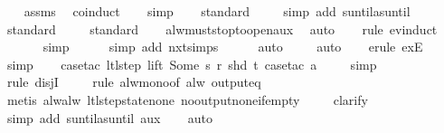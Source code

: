 \begin{isabellebody}
%
\isadelimproof
\ \ %
\endisadelimproof
%
\isatagproof
{}\isamarkupfalse%
\ assms\ \isamarkupfalse%
\ coinduct\isanewline
\ \ \isamarkupfalse%
\ simp\isanewline
\ \ \isamarkupfalse%
\ standard\isanewline
\ \ \ \isamarkupfalse%
\ {\isacharparenleft}simp\ add{\isacharcolon}\ suntil{\isacharunderscore}as{\isacharunderscore}until{\isacharparenright}\isanewline
\ \ \ \isamarkupfalse%
\ standard\isanewline
\ \ \ \isamarkupfalse%
\ standard\isanewline
\ \ \isamarkupfalse%
\ alw{\isacharunderscore}must{\isacharunderscore}stop{\isacharunderscore}to{\isacharunderscore}open{\isacharunderscore}aux\ \isamarkupfalse%
\ auto{\isacharbrackleft}{}{\isacharbrackright}\isanewline
\ \ \isamarkupfalse%
\ {\isacharparenleft}rule\ ev{\isachardot}induct{\isacharparenright}\isanewline
\ \ \ \ \ \isamarkupfalse%
\ simp\isanewline
\ \ \ \ \isamarkupfalse%
\ {\isacharparenleft}simp\ add{\isacharcolon}\ nxt{\isachardot}simps{\isacharparenright}\isanewline
\ \ \ \ \isamarkupfalse%
\ auto{\isacharbrackleft}{}{\isacharbrackright}\isanewline
\ \ \ \isamarkupfalse%
\ auto{\isacharbrackleft}{}{\isacharbrackright}\isanewline
\isanewline
\ \ \isamarkupfalse%
\ {\isacharparenleft}erule\ exE{\isacharparenright}{\isacharplus}\isanewline
\ \ \isamarkupfalse%
\ simp\isanewline
\ \ \isamarkupfalse%
\ {\isacharparenleft}case{\isacharunderscore}tac\ {\isachardoublequoteopen}ltl{\isacharunderscore}step\ lift\ {\isacharparenleft}Some\ s{\isacharparenright}\ r\ {\isacharparenleft}shd\ t{\isacharparenright}{\isachardoublequoteclose}{\isacharcomma}\ case{\isacharunderscore}tac\ a{\isacharparenright}\isanewline
\ \ \ \isamarkupfalse%
\ simp\isanewline
\ \ \ \isamarkupfalse%
\ {\isacharparenleft}rule\ disjI{}{\isacharparenright}\isanewline
\ \ \ \isamarkupfalse%
\ {\isacharparenleft}rule\ alw{\isacharunderscore}mono{\isacharbrackleft}of\ {\isachardoublequoteopen}alw\ {\isacharparenleft}output{\isacharunderscore}eq\ {\isacharbrackleft}{\isacharbrackright}{\isacharparenright}{\isachardoublequoteclose}{\isacharbrackright}{\isacharparenright}\isanewline
\ \ \ \ \isamarkupfalse%
\ {\isacharparenleft}metis\ alw{\isacharunderscore}alw\ ltl{\isacharunderscore}step{\isacharunderscore}state{\isacharunderscore}none\ no{\isacharunderscore}output{\isacharunderscore}none{\isacharunderscore}if{\isacharunderscore}empty{\isacharparenright}\isanewline
\ \ \ \isamarkupfalse%
\ clarify\isanewline
\ \ \ \isamarkupfalse%
\ {\isacharparenleft}simp\ add{\isacharcolon}\ suntil{\isacharunderscore}as{\isacharunderscore}until\ aux{\isacharparenright}\isanewline
\ \ \isamarkupfalse%
\ auto%
\endisatagproof
{\isafoldproof}%
%
\isadelimproof
\isanewline
%
\endisadelimproof
%
\isadelimtheory
\isanewline
%
\endisadelimtheory
%
\isatagtheory
{}\isamarkupfalse%
%
\endisatagtheory
{\isafoldtheory}%
%
\isadelimtheory
%
\endisadelimtheory
%
\end{isabellebody}%
